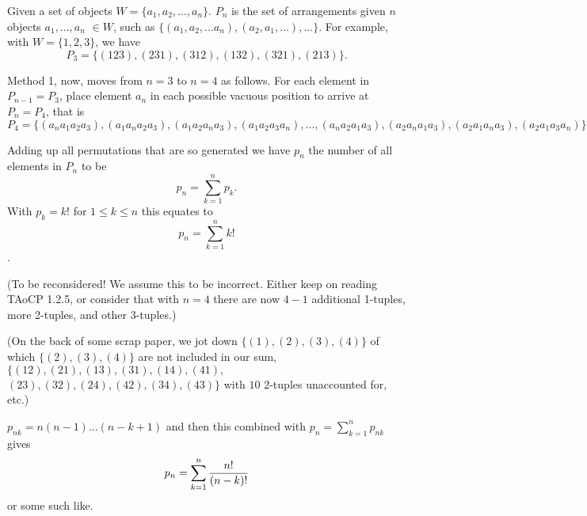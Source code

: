 Given a set of objects $W=\{a_1,a_2,...,a_n\}$.
$P_n$ is the set of arrangements given $n$ objects
$a_1,...,a_n$ $\in W$, such as
$\{(a_1,a_2,...a_n),(a_2,a_1,...),...\}$. For example,
with $W=\{1,2,3\}$, we have
$$P_3=\{(123),(231),(312),(132),(321),(213)\}.$$

\e
Method 1, now, moves from $n=3$ to $n=4$ as follows.
For each element in $P_{n-1}=P_3$, place element
$a_n$ in each possible vacuous position to arrive at
$P_n=P_4$, that is
$$P_4=\{(a_na_1a_2a_3),
       (a_1a_na_2a_3),
       (a_1a_2a_na_3),
       (a_1a_2a_3a_n),
       ...,
       (a_na_2a_1a_3),
       (a_2a_na_1a_3),
       (a_2a_1a_na_3),
       (a_2a_1a_3a_n)\}$$

\e
Adding up all permutations that are so generated we have
$p_n$ the number of all elements in $P_n$ to be
$$p_n=\sum_{k=1}^np_k.$$
With $p_k=k!$ for $1\le k\le n$ this equates to
$$p_n=\sum_{k=1}^n k!$$.

\e
(To be reconsidered! We assume this to be incorrect. Either
keep on reading TAoCP 1.2.5, or consider that with $n=4$ there
are now $4-1$ additional 1-tuples, more 2-tuples,
and other 3-tuples.)

\e
(On the back of some scrap paper, we jot down
$\{(1),(2),(3),(4)\}$ of which $\{(2),(3),(4)\}$ are
not included in our sum, $\{(12),(21),(13),(31),(14),(41),$
$(23),(32),(24),(42),(34),(43)\}$ with $10$ 2-tuples unaccounted
for, etc.)

\e
$p_{nk}=n(n-1)...(n-k+1)$
and then this combined with $p_n=\sum_{k=1}^n p_{nk}$
gives
$$p_n=\sum_{k=1}^n {n!\over{(n-k)!}}$$
or some such like.
\bye
